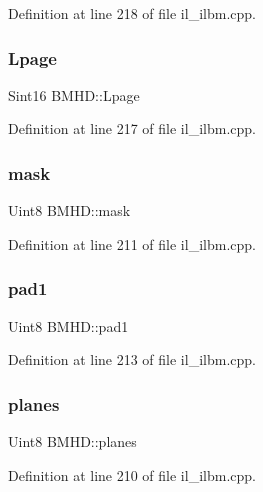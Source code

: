 Definition at line 218 of file il\+\_\+ilbm.\+cpp.

\mbox{\label{structBMHD_acaaa4dc99b90913376f70866b14a1fcc}} 
\subsubsection{\texorpdfstring{Lpage}{Lpage}}
{\footnotesize\ttfamily Sint16 B\+M\+H\+D\+::\+Lpage}



Definition at line 217 of file il\+\_\+ilbm.\+cpp.

\mbox{\label{structBMHD_a0cbe61c339c98169760dd61eacb5aa01}} 
\subsubsection{\texorpdfstring{mask}{mask}}
{\footnotesize\ttfamily Uint8 B\+M\+H\+D\+::mask}



Definition at line 211 of file il\+\_\+ilbm.\+cpp.

\mbox{\label{structBMHD_a791eb72779d69a22e98120170828401d}} 
\subsubsection{\texorpdfstring{pad1}{pad1}}
{\footnotesize\ttfamily Uint8 B\+M\+H\+D\+::pad1}



Definition at line 213 of file il\+\_\+ilbm.\+cpp.

\mbox{\label{structBMHD_a176d660ed4df819f957e1d3f3edefe6c}} 
\subsubsection{\texorpdfstring{planes}{planes}}
{\footnotesize\ttfamily Uint8 B\+M\+H\+D\+::planes}



Definition at line 210 of file il\+\_\+ilbm.\+cpp.

